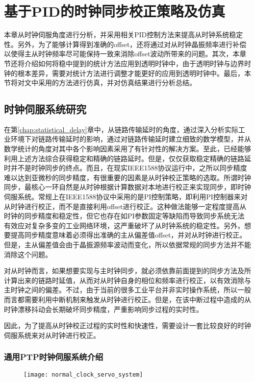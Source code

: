 
\chapter{基于PID的时钟同步校正策略及仿真}
本章从时钟伺服角度进行分析，并采用相关PID控制方法来提高从时钟系统稳定性。另外，为了能够计算得到准确的offset，还将通过对从时钟晶振频率进行补偿以使得主从时钟频率尽可能保持一致来消除offset波动所带来的问题。其次，本章节还将介绍如何将稳中提到的统计方法应用到透明时钟中，由于透明时钟与边界时钟的根本差异，需要对统计方法进行调整才能更好的应用到透明时钟中。最后，本节将对文中采用的方法进行仿真，并对仿真结果进行分析总结。

\section{时钟伺服系统研究}
在第\ref{chap:statistical_delay}章中，从链路传输延时的角度，通过深入分析实际工业环境下对链路传输延时的影响，通过对链路传输延时建立细致的数学模型，并从数学统计的角度对其中各个影响因素采用了有针对性的解决方案。至此，已经能够利用上述方法综合获得稳定和精确的链路延时。但是，仅仅获取稳定精确的链路延时并不是时钟同步的终点。而且，在现实IEEE1588协议运行中，之所以同步精度难以达到亚微秒的同步精度，有很重要的因素是从时钟校正策略的选取。所谓时钟同步，最核心一环自然是从时钟根据计算数据对本地进行校正来实现同步，即时钟伺服系统。常规上在IEEE1588协议中采用的是PI控制策略，即利用PI控制器来对从时钟进行校正，而不是直接利用offset进行校正。这种做法能够一定程度提高从时钟的同步精度和稳定性，但它也存在如PI参数固定等缺陷而导致同步系统无法有效应对复杂多变的工业网络环境，这严重破坏了从时钟系统的稳定性。另外，想要提高同步精度意味着必须得出准确的主从偏差值offset，并对从时钟进行校正。但是，主从偏差值会由于晶振源频率波动而变化，所以依据常规的同步方法并不能消除这个问题。

对从时钟而言，如果想要实现与主时钟同步，就必须依靠前面提到的同步方法及所计算出来的链路时延值，从而对从时钟自身的相位和频率进行校正，以有效消除与主时钟之间的偏差。不过，由于当前的很多工业平台并非实时操作系统，所以一般而言都需要利用中断机制来触发从时钟进行校正。但是，在该中断过程中造成的从时钟漂移抖动会长期破坏同步精度，严重影响同步过程的实时性。

因此，为了提高从时钟校正过程的实时性和快速性，需要设计一套比较良好的时钟伺服系统来对从时钟进行校正。

\subsection{通用PTP时钟伺服系统介绍}
\begin{figure}[hbp]
  \centering
  \begin{minipage}[b]{0.7\textwidth}
   \captionstyle{\centering}
   \centering
   \texttt{[image: normal\_clock\_servo\_system]}
  \end{minipage}
\end{figure}

